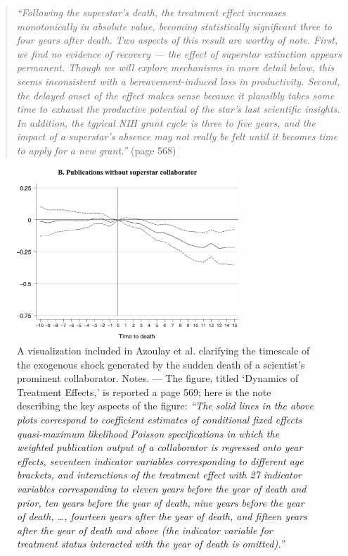 \documentclass[11pt]{article}
\begin{document}
\begin{refsection}
\begin{quote}
  \textit{
    ``Following the superstar's death, the treatment effect increases
    monotonically in absolute value, becoming statistically significant three to
    four years after death. Two aspects of this result are worthy of note.
    First, we find no evidence of recovery --- the effect of superstar
    extinction appears permanent. Though we will explore mechanisms in more
    detail below, this seems inconsistent with a bereavement-induced loss in
    productivity.  Second, the delayed onset of the effect makes sense because
    it plausibly takes some time to exhaust the productive potential of the
    star's last scientific insights. In addition, the typical NIH grant cycle is
    three to five years, and the impact of a superstar's absence may not really
    be felt until it becomes time to apply for a new grant.''
  }
  (page 568)
\end{quote}

\begin{figure}[!htbp]
    \begin{center}
     
\includegraphics[width=0.75\textwidth]{exhibits/from_azoulay_et_al_2010.png}
    \end{center}
    \caption{A visualization included in Azoulay et al. 
    \autocite*[][]{azoulay_et_al_2010} clarifying the timescale of the exogenous
    shock generated by the sudden death of a scientist's prominent collaborator.
    Notes. --- The figure, titled `Dynamics of Treatment Effects,' is reported a
    page 569; here is the note describing the key aspects of the figure: \textit{``The
    solid lines in the above plots correspond to coefficient estimates of
    conditional fixed effects quasi-maximum likelihood Poisson specifications in
    which the weighted publication output of a collaborator is regressed onto
    year effects, seventeen indicator variables corresponding to different age
    brackets, and interactions of the treatment effect with 27 indicator
    variables corresponding to eleven years before the year of death and prior,
    ten years before the year of death, nine years before the year of death,
    \ldots, fourteen years after the year of death, and fifteen years after the
    year of death and above (the indicator variable for treatment status
    interacted with the year of death is omitted).''}}
    \label{fig:azoulay_et_al_2010}
\end{figure}


\end{refsection}
\end{document}
